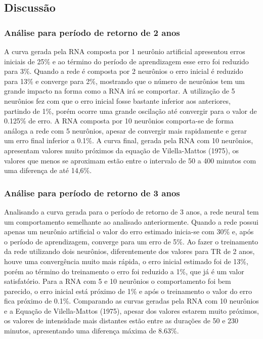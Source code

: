 \subsection{Discussão}

\subsubsection{Análise para período de retorno de 2 anos}
A curva gerada pela RNA composta por 1 neurônio artificial apresentou erros iniciais de 25\% e ao término do período de aprendizagem esse erro foi reduzido para 3\%. Quando a rede é composta por 2 neurônios o erro inicial é reduzido para 13\% e converge para 2\%, mostrando que o número de neurônios tem um grande impacto na forma como a RNA irá se comportar. A utilização de 5 neurônios fez com que o erro inicial fosse bastante inferior aos anteriores, partindo de 1\%, porém ocorre uma grande oscilação até convergir para o valor de 0.125\% de erro. A RNA composta por 10 neurônios comporta-se de forma análoga a rede com 5 neurônios, apesar de convergir mais rapidamente e gerar um erro final inferior a 0.1\%. A curva final, gerada pela RNA com 10 neurônios, apresentam valores muito próximos da equação de Vilella-Mattos (1975), os valores que menos se aproximam estão entre o intervalo de 50 a 400 minutos com uma diferença de até 14,6\%.

\subsubsection{Análise para período de retorno de 3 anos}
Analisando a curva gerada para o período de retorno de 3 anos, a rede neural tem um comportamento semelhante ao analisado anteriormente. Quando a rede possui apenas um neurônio artificial o valor do erro estimado inicia-se com 30\% e, após o período de aprendizagem, converge para um erro de 5\%. Ao fazer o treinamento da rede utilizando dois neurônios, diferentemente dos valores para TR de 2 anos, houve uma convergência muito mais rápida, o erro inicial estimado foi de 13\%, porém ao término do treinamento o erro foi reduzido a 1\%, que já é um valor satisfatório. Para a RNA com 5 e 10 neurônios o comportamento foi bem parecido, o erro inicial está próximo de 1\% e após o treinamento o valor do erro fica próximo de 0.1\%. Comparando as curvas geradas pela RNA com 10 neurônios e a Equação de Vilella-Mattos (1975), apesar dos valores estarem muito próximos, os valores de intensidade mais distantes estão entre as durações de 50 e 230 minutos, apresentando uma diferença máxima de 8.63\%.

